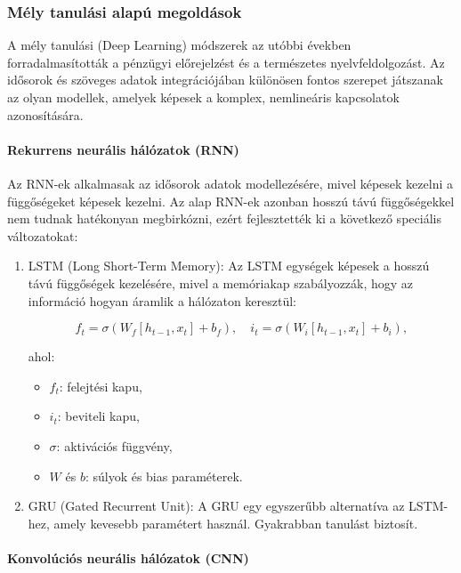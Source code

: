 \documentclass[11pt]{article}
\providecommand{\tightlist}{%
      \setlength{\itemsep}{0pt}\setlength{\parskip}{0pt}}
\begin{document}
\subsubsection{Mély tanulási alapú
megoldások}\label{muxe9ly-tanuluxe1si-alapuxfa-megolduxe1sok}

A mély tanulási (Deep Learning) módszerek az utóbbi években
forradalmasították a pénzügyi előrejelzést és a természetes
nyelvfeldolgozást. Az idősorok és szöveges adatok integrációjában
különösen fontos szerepet játszanak az olyan modellek, amelyek képesek a
komplex, nemlineáris kapcsolatok azonosítására.

\paragraph{Rekurrens neurális hálózatok
(RNN)}\label{rekurrens-neuruxe1lis-huxe1luxf3zatok-rnn}

Az RNN-ek alkalmasak az idősorok adatok modellezésére, mivel képesek
kezelni a függőségeket képesek kezelni. Az alap RNN-ek azonban hosszú
távú függőségekkel nem tudnak hatékonyan megbirkózni, ezért
fejlesztették ki a következő speciális változatokat:

\begin{enumerate}
\def\labelenumi{\arabic{enumi}.}
\item
  LSTM (Long Short-Term Memory): Az LSTM egységek képesek a hosszú távú
  függőségek kezelésére, mivel a memóriakap szabályozzák, hogy az
  információ hogyan áramlik a hálózaton keresztül:

  \[f_t = \sigma(W_f[h_{t-1}, x_t] + b_f),\quad i_t = \sigma(W_i[h_{t-1}, x_t] + b_i),\]

  ahol:

  \begin{itemize}
  \tightlist
  \item
    \(f_t\): felejtési kapu,
  \item
    \(i_t\): beviteli kapu,
  \item
    \(\sigma\): aktivációs függvény,
  \item
    \(W\) és \(b\): súlyok és bias paraméterek.
  \end{itemize}
\item
  GRU (Gated Recurrent Unit): A GRU egy egyszerűbb alternatíva az
  LSTM-hez, amely kevesebb paramétert használ. Gyakrabban tanulást
  biztosít.
\end{enumerate}

\paragraph{Konvolúciós neurális hálózatok
(CNN)}\label{konvoluxfaciuxf3s-neuruxe1lis-huxe1luxf3zatok-cnn}
\end{document}
